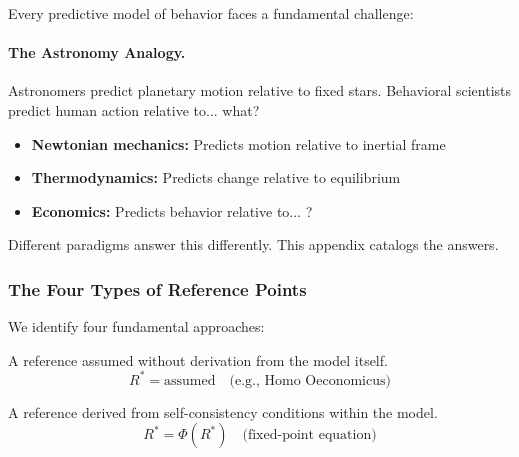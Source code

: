 Every predictive model of behavior faces a fundamental challenge:

\begin{center}
\end{center}

\paragraph{The Astronomy Analogy.}
Astronomers predict planetary motion relative to fixed stars.
Behavioral scientists predict human action relative to... what?

\begin{itemize}[nosep]
    \item \textbf{Newtonian mechanics:} Predicts motion relative to inertial frame
    \item \textbf{Thermodynamics:} Predicts change relative to equilibrium
    \item \textbf{Economics:} Predicts behavior relative to... ?
\end{itemize}

Different paradigms answer this differently. This appendix catalogs the answers.

\subsubsection{The Four Types of Reference Points}

We identify four fundamental approaches:

\begin{definition}
\label{def:AY-exogenous}
A reference assumed without derivation from the model itself.
\begin{equation}
R^* = \text{assumed} \quad \text{(e.g., Homo Oeconomicus)}
\end{equation}
\end{definition}

\begin{definition}
\label{def:AY-endogenous}
A reference derived from self-consistency conditions within the model.
\begin{equation}
R^* = \Phi(R^*) \quad \text{(fixed-point equation)}
\end{equation}
\end{definition}

